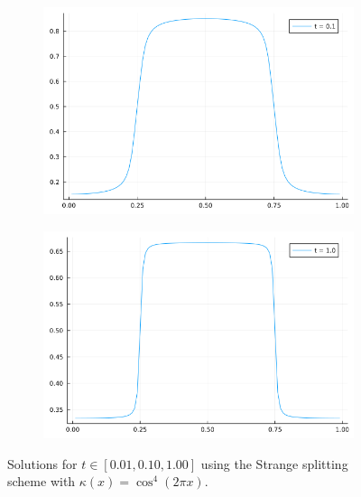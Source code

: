 \documentclass[12pt]{report}
\begin{document}
\begin{solution}
\begin{figure}[H]
\begin{subfigure}{0.495\linewidth}
        \includegraphics[width=\linewidth]{images/4b-2.png}
      \end{subfigure}
      \begin{subfigure}{0.495\linewidth}
        \centering
        \includegraphics[width=\linewidth]{images/4b-3.png}
      \end{subfigure}
      \caption{Solutions for $t\in[0.01,0.10,1.00]$ using the Strange splitting scheme with $\kappa(x) = \cos^4(2\pi x)$.}
    \end{figure}


  \end{solution}

\newpage

\end{document}
